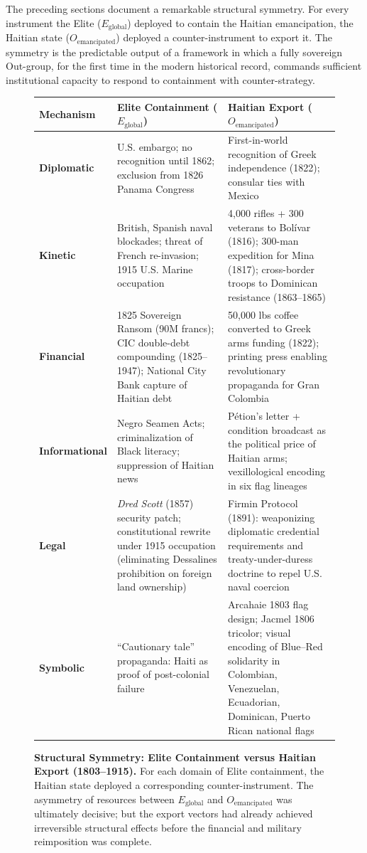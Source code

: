 The preceding sections document a remarkable structural symmetry. For every instrument the Elite ($E_{\text{global}}$) deployed to contain the Haitian emancipation, the Haitian state ($O_{\text{emancipated}}$) deployed a counter-instrument to export it. The symmetry is the predictable output of a framework in which a fully sovereign Out-group, for the first time in the modern historical record, commands sufficient institutional capacity to respond to containment with counter-strategy.

\begin{figure}[h]
\centering
\renewcommand{\arraystretch}{1.4}
\begin{tabular}{@{}>{\bfseries}p{3.8cm}@{\hspace{0.5cm}}p{5.5cm}@{\hspace{0.5cm}}p{5.5cm}@{}}
\toprule
\textbf{Mechanism} & \textbf{Elite Containment} ($E_{\text{global}}$) & \textbf{Haitian Export} ($O_{\text{emancipated}}$) \\
\midrule
Diplomatic & U.S. embargo; no recognition until 1862; exclusion from 1826 Panama Congress & First-in-world recognition of Greek independence (1822); consular ties with Mexico \\[4pt]
Kinetic & British, Spanish naval blockades; threat of French re-invasion; 1915 U.S. Marine occupation & 4,000 rifles + 300 veterans to Bolívar (1816); 300-man expedition for Mina (1817); cross-border troops to Dominican resistance (1863--1865) \\[4pt]
Financial & 1825 Sovereign Ransom (90M francs); CIC double-debt compounding (1825--1947); National City Bank capture of Haitian debt & 50,000 lbs coffee converted to Greek arms funding (1822); printing press enabling revolutionary propaganda for Gran Colombia \\[4pt]
Informational & Negro Seamen Acts; criminalization of Black literacy; suppression of Haitian news & Pétion's letter + condition broadcast as the political price of Haitian arms; vexillological encoding in six flag lineages \\[4pt]
Legal & \textit{Dred Scott} (1857) security patch; constitutional rewrite under 1915 occupation (eliminating Dessalines prohibition on foreign land ownership) & Firmin Protocol (1891): weaponizing diplomatic credential requirements and treaty-under-duress doctrine to repel U.S. naval coercion \\[4pt]
Symbolic & ``Cautionary tale'' propaganda: Haiti as proof of post-colonial failure & Arcahaie 1803 flag design; Jacmel 1806 tricolor; visual encoding of Blue--Red solidarity in Colombian, Venezuelan, Ecuadorian, Dominican, Puerto Rican national flags \\
\bottomrule
\end{tabular}
\caption{\textbf{Structural Symmetry: Elite Containment versus Haitian Export (1803--1915).} For each domain of Elite containment, the Haitian state deployed a corresponding counter-instrument. The asymmetry of resources between $E_{\text{global}}$ and $O_{\text{emancipated}}$ was ultimately decisive; but the export vectors had already achieved irreversible structural effects before the financial and military reimposition was complete.}
\label{fig:symmetry_table}
\end{figure}

